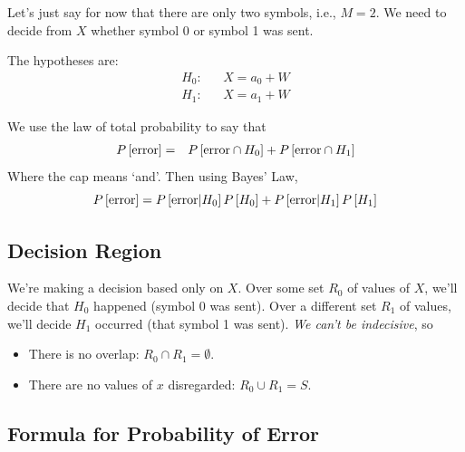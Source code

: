 Let's just say for now that there are only two symbols, i.e., $M=2$.  We
need to decide from $X$ whether symbol 0 or symbol 1 was sent.

The hypotheses are:
\begin{eqnarray}
  H_0: && X = a_0 + W \nonumber \\
  H_1: && X = a_1 + W \nonumber
\end{eqnarray}  %

We use the law of total probability to say that
\begin{eqnarray}
  P\left[{\mbox{error}}\right]    &=& P\left[{\mbox{error} \cap H_0}\right] +  P\left[{\mbox{error} \cap H_1 }\right]
\end{eqnarray}
Where the cap means `and'. Then using Bayes' Law,
\[
   P\left[{\mbox{error}}\right]  = P\left[{\mbox{error} | H_0}\right]P\left[{H_0}\right] +  P\left[{\mbox{error} | H_1 }\right]P\left[{H_1}\right]
\]

\subsection{Decision Region}

We're making a decision based only on $X$.  Over some set $R_0$ of
values of $X$, we'll decide that $H_0$ happened (symbol 0 was sent).
Over a different set $R_1$ of values, we'll decide $H_1$ occurred
(that symbol 1 was sent).  \emph{We can't be indecisive}, so
\begin{itemize}
  \item There is no overlap: $R_0 \cap R_1 = \emptyset$.
  \item There are no values of $x$ disregarded: $R_0 \cup R_1 = S$.
\end{itemize}

\subsection{Formula for Probability of Error}

